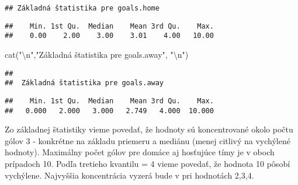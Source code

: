 \documentclass[
]{article}
\newenvironment{Shaded}{\begin{snugshade}}{\end{snugshade}}
\newcommand{\AttributeTok}[1]{\textcolor[rgb]{0.77,0.63,0.00}{#1}}
\newcommand{\FunctionTok}[1]{\textcolor[rgb]{0.00,0.00,0.00}{#1}}
\newcommand{\NormalTok}[1]{#1}
\newcommand{\SpecialCharTok}[1]{\textcolor[rgb]{0.00,0.00,0.00}{#1}}
\newcommand{\StringTok}[1]{\textcolor[rgb]{0.31,0.60,0.02}{#1}}
\begin{document}
\begin{verbatim}
## Základná štatistika pre goals.home
\end{verbatim}

\begin{Shaded}
\end{Shaded}

\begin{verbatim}
##    Min. 1st Qu.  Median    Mean 3rd Qu.    Max. 
##    0.00    2.00    3.00    3.01    4.00   10.00
\end{verbatim}

\begin{Shaded}
\begin{Highlighting}[]
\FunctionTok{cat}\NormalTok{(}\StringTok{"}\SpecialCharTok{\textbackslash{}n}\StringTok{"}\NormalTok{,}\StringTok{"Základná štatistika pre goals.away"}\NormalTok{, }\StringTok{"}\SpecialCharTok{\textbackslash{}n}\StringTok{"}\NormalTok{)}
\end{Highlighting}
\end{Shaded}

\begin{verbatim}
## 
##  Základná štatistika pre goals.away
\end{verbatim}

\begin{Shaded}
\end{Shaded}

\begin{verbatim}
##    Min. 1st Qu.  Median    Mean 3rd Qu.    Max. 
##   0.000   2.000   3.000   2.749   4.000  10.000
\end{verbatim}

Zo základnej štatistiky vieme povedať, že hodnoty sú koncentrované okolo
počtu gólov 3 - konkrétne na základu priemeru a mediánu (menej citlivý
na vychýlené hodnoty). Maximálny počet gólov pre domáce aj hosťujúce
tímy je v oboch prípadoch 10. Podľa tretieho kvantilu = 4 vieme povedať,
že hodnota 10 pôsobí vychýlene. Najvyššia koncentrácia vyzerá bude v pri
hodnotách 2,3,4.

\begin{Shaded}
\end{Shaded}
\end{document}
